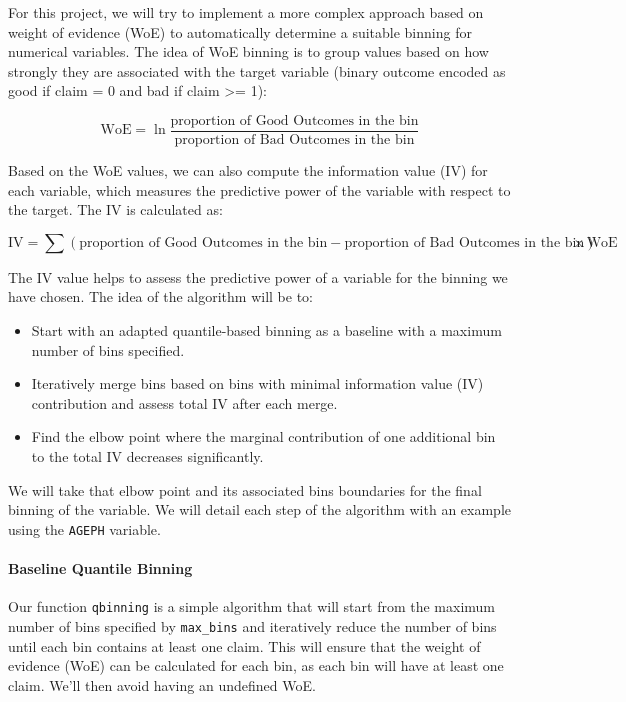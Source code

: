 \documentclass[
  english,
  11pt,
]{article}
\providecommand{\tightlist}{%
  \setlength{\itemsep}{0pt}\setlength{\parskip}{0pt}}
\begin{document}
For this project, we will try to implement a more complex approach based
on weight of evidence (WoE) to automatically determine a suitable
binning for numerical variables. The idea of WoE binning is to group
values based on how strongly they are associated with the target
variable (binary outcome encoded as good if claim = 0 and bad if claim
\textgreater= 1):

\[\text{WoE} = \ln \frac{\text{proportion of Good Outcomes in the bin}}{\text{proportion of Bad Outcomes in the bin}}\]

Based on the WoE values, we can also compute the information value (IV)
for each variable, which measures the predictive power of the variable
with respect to the target. The IV is calculated as:

\[\text{IV} = \sum (\text{proportion of Good Outcomes in the bin} - \text{proportion of Bad Outcomes in the bin}) \times \text{WoE}\]

The IV value helps to assess the predictive power of a variable for the
binning we have chosen. The idea of the algorithm will be to:

\begin{itemize}
\tightlist
\item
  Start with an adapted quantile-based binning as a baseline with a
  maximum number of bins specified.
\item
  Iteratively merge bins based on bins with minimal information value
  (IV) contribution and assess total IV after each merge.
\item
  Find the elbow point where the marginal contribution of one additional
  bin to the total IV decreases significantly.
\end{itemize}

We will take that elbow point and its associated bins boundaries for the
final binning of the variable. We will detail each step of the algorithm
with an example using the \texttt{AGEPH} variable.

\paragraph{Baseline Quantile Binning}\label{baseline-quantile-binning}

Our function \texttt{qbinning} is a simple algorithm that will start
from the maximum number of bins specified by \texttt{max\_bins} and
iteratively reduce the number of bins until each bin contains at least
one claim. This will ensure that the weight of evidence (WoE) can be
calculated for each bin, as each bin will have at least one claim. We'll
then avoid having an undefined WoE.
\end{document}
